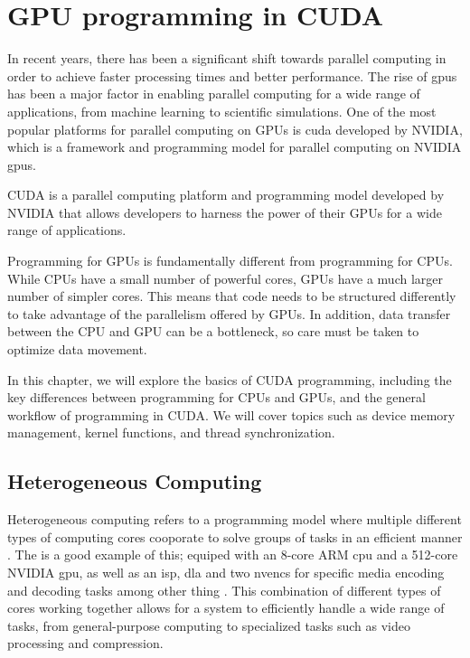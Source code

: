 \section{GPU programming in CUDA}
In recent years, there has been a significant shift towards parallel computing in order to achieve faster processing times and better performance.
The rise of \glspl{gpu} has been a major factor in enabling parallel computing for a wide range of applications, from machine learning to scientific simulations.
One of the most popular platforms for parallel computing on GPUs is \gls{cuda} developed by NVIDIA, which is a framework and programming model for parallel computing on NVIDIA \glspl{gpu}.

CUDA is a parallel computing platform and programming model developed by NVIDIA that allows developers to harness the power of their GPUs for a wide range of applications.

Programming for GPUs is fundamentally different from programming for CPUs.
While CPUs have a small number of powerful cores, GPUs have a much larger number of simpler cores.
This means that code needs to be structured differently to take advantage of the parallelism offered by GPUs.
In addition, data transfer between the CPU and GPU can be a bottleneck, so care must be taken to optimize data movement.

In this chapter, we will explore the basics of CUDA programming, including the key differences between programming for CPUs and GPUs, and the general workflow of programming in CUDA.
We will cover topics such as device memory management, kernel functions, and thread synchronization.


\subsection{Heterogeneous Computing}
Heterogeneous computing refers to a programming model where multiple different types of computing cores cooporate to solve groups of tasks in an efficient manner \cite{armWhatHeterogenousCompute}.
The \jx is a good example of this; equiped with an 8-core ARM \gls{cpu} and a 512-core NVIDIA \gls{gpu}, as well as an \gls{isp}, \gls{dla} and two \glspl{nvenc} for specific media encoding and decoding tasks among other thing \cite[9, 8, 23, 15-22]{nvidiaNVIDIAJetsonAGX2019}.
This combination of different types of cores working together allows for a system to efficiently handle a wide range of tasks, from general-purpose computing to specialized tasks such as video processing and compression.

